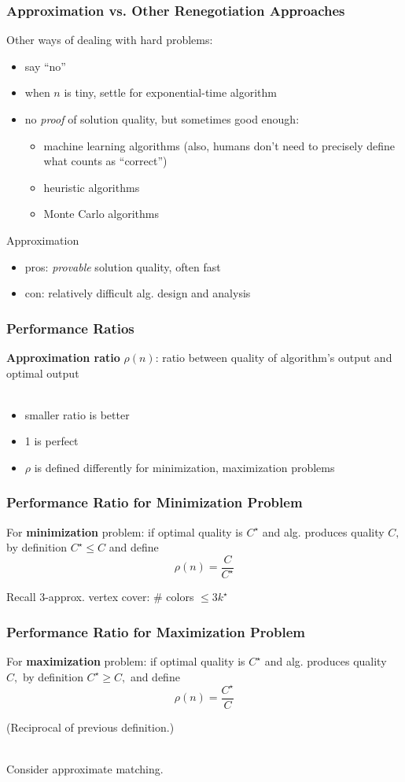 \documentclass[10pt,aspectratio=169]{beamer}
\newcommand{\stanza}{ \\~\ }
\begin{document}
\begin{frame} \frametitle{Approximation vs. Other Renegotiation Approaches}
Other ways of dealing with hard problems:
\begin{itemize}
  \item say ``no''
  \item when $n$ is tiny, settle for exponential-time algorithm
  \item no \emph{proof} of solution quality, but sometimes good enough:
    \begin{itemize}
      \item machine learning algorithms (also, humans don't need to precisely define what counts as ``correct'')
      \item heuristic algorithms
      \item Monte Carlo algorithms
    \end{itemize}
\end{itemize}

Approximation
\begin{itemize}
  \item pros: \emph{provable} solution quality, often fast
  \item con: relatively difficult alg. design and analysis
\end{itemize}
\end{frame}

\begin{frame} \frametitle{Performance Ratios}
\textbf{Approximation ratio} $\rho(n)$: ratio between quality of algorithm's output
and optimal output \stanza
\begin{itemize}
  \item smaller ratio is better
  \item 1 is perfect
  \item $\rho$ is defined differently for minimization, maximization problems
\end{itemize}
\end{frame}

\begin{frame} \frametitle{Performance Ratio for Minimization Problem}
  For \textbf{minimization} problem: if optimal quality is $C^\star$ and alg. produces
      quality $C,$ by definition $C^\star \leq C$ and define
      \[ \rho(n) = \frac{C}{C^\star} \]
  
  Recall 3-approx. vertex cover: \# colors $\leq 3 k^\star$
  \end{frame}
  
  \begin{frame} \frametitle{Performance Ratio for Maximization Problem}
For \textbf{maximization} problem: if optimal quality is $C^\star$ and alg. produces
    quality $C,$ by definition $C^\star \geq C,$ and define
    \[ \rho(n) = \frac{C^\star}{C} \]
  
    (Reciprocal of previous definition.)
    \stanza
    
    Consider approximate matching.

  \end{frame}
\end{document}
